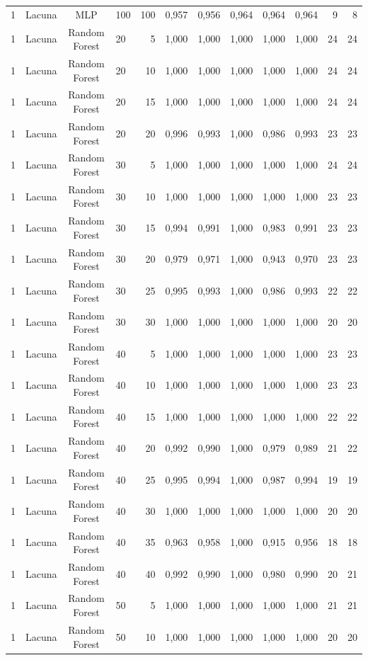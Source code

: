 \begin{longtable}{ccclrrrrrrrr}
1 & Lacuna & MLP & 100 & 100 & 0,957 & 0,956 & 0,964 & 0,964 & 0,964 & 9 & 8 \\
1 & Lacuna & Random Forest & 20 & 5 & 1,000 & 1,000 & 1,000 & 1,000 & 1,000 & 24 & 24 \\
1 & Lacuna & Random Forest & 20 & 10 & 1,000 & 1,000 & 1,000 & 1,000 & 1,000 & 24 & 24 \\
1 & Lacuna & Random Forest & 20 & 15 & 1,000 & 1,000 & 1,000 & 1,000 & 1,000 & 24 & 24 \\
1 & Lacuna & Random Forest & 20 & 20 & 0,996 & 0,993 & 1,000 & 0,986 & 0,993 & 23 & 23 \\
1 & Lacuna & Random Forest & 30 & 5 & 1,000 & 1,000 & 1,000 & 1,000 & 1,000 & 24 & 24 \\
1 & Lacuna & Random Forest & 30 & 10 & 1,000 & 1,000 & 1,000 & 1,000 & 1,000 & 23 & 23 \\
1 & Lacuna & Random Forest & 30 & 15 & 0,994 & 0,991 & 1,000 & 0,983 & 0,991 & 23 & 23 \\
1 & Lacuna & Random Forest & 30 & 20 & 0,979 & 0,971 & 1,000 & 0,943 & 0,970 & 23 & 23 \\
1 & Lacuna & Random Forest & 30 & 25 & 0,995 & 0,993 & 1,000 & 0,986 & 0,993 & 22 & 22 \\
1 & Lacuna & Random Forest & 30 & 30 & 1,000 & 1,000 & 1,000 & 1,000 & 1,000 & 20 & 20 \\
1 & Lacuna & Random Forest & 40 & 5 & 1,000 & 1,000 & 1,000 & 1,000 & 1,000 & 23 & 23 \\
1 & Lacuna & Random Forest & 40 & 10 & 1,000 & 1,000 & 1,000 & 1,000 & 1,000 & 23 & 23 \\
1 & Lacuna & Random Forest & 40 & 15 & 1,000 & 1,000 & 1,000 & 1,000 & 1,000 & 22 & 22 \\
1 & Lacuna & Random Forest & 40 & 20 & 0,992 & 0,990 & 1,000 & 0,979 & 0,989 & 21 & 22 \\
1 & Lacuna & Random Forest & 40 & 25 & 0,995 & 0,994 & 1,000 & 0,987 & 0,994 & 19 & 19 \\
1 & Lacuna & Random Forest & 40 & 30 & 1,000 & 1,000 & 1,000 & 1,000 & 1,000 & 20 & 20 \\
1 & Lacuna & Random Forest & 40 & 35 & 0,963 & 0,958 & 1,000 & 0,915 & 0,956 & 18 & 18 \\
1 & Lacuna & Random Forest & 40 & 40 & 0,992 & 0,990 & 1,000 & 0,980 & 0,990 & 20 & 21 \\
1 & Lacuna & Random Forest & 50 & 5 & 1,000 & 1,000 & 1,000 & 1,000 & 1,000 & 21 & 21 \\
1 & Lacuna & Random Forest & 50 & 10 & 1,000 & 1,000 & 1,000 & 1,000 & 1,000 & 20 & 20 \\

\end{longtable}
